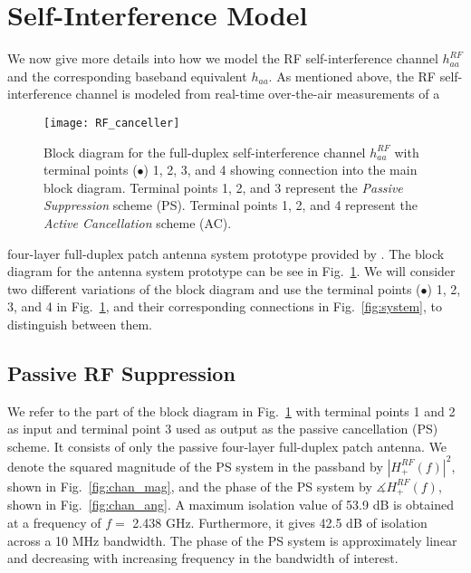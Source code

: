 \documentclass[12pt, journal,draftcls,letterpaper,onecolumn]{IEEEtran}
\begin{document}
\section{Self-Interference Model}
\label{sec:self_int_model}
We now give more details into how we model the RF self-interference channel $h^{RF}_{aa}$ and the corresponding baseband equivalent $h_{aa}$.  As mentioned above, the RF self-interference channel is modeled from real-time over-the-air measurements of a 
\begin{figure}[htp]
\begin{center} 
  \texttt{[image: RF\_canceller]}
\caption[fig:system]{Block diagram for the full-duplex self-interference channel $h_{aa}^{RF}$ with terminal points ($\bullet$) 1, 2, 3, and 4 showing connection into the main block diagram.  Terminal points 1, 2, and 3 represent the \emph{Passive Suppression} scheme (PS).  Terminal points 1, 2, and 4 represent the \emph{Active Cancellation} scheme (AC).}
  \label{fig:RF_canceller}
\end{center} 
\end{figure} 
four-layer full-duplex patch antenna system prototype provided by \cite{RISC_WEB}. 
The block diagram for the antenna system prototype can be see in Fig.~\ref{fig:RF_canceller}.  We will consider two different variations of the block diagram and use the terminal points ($\bullet$) 1, 2, 3, and 4 in Fig.~\ref{fig:RF_canceller}, and their corresponding connections in Fig.~\ref{fig:system}, to distinguish between them.  
 
\subsection{Passive RF Suppression}
We refer to the part of the block diagram in Fig.~\ref{fig:RF_canceller} with terminal points 1 and 2 as input and terminal point 3 used as output as the passive cancellation (PS) scheme.  It consists of only the passive four-layer full-duplex patch antenna.  We denote the squared magnitude of the PS system in the passband by $|H^{RF}_{+}(f)|^2$, shown in Fig.~\ref{fig:chan_mag}, and the phase of the PS system by $\measuredangle H^{RF}_{+}(f)$, shown in Fig.~\ref{fig:chan_ang}. A maximum isolation value of 53.9 dB is obtained at a frequency of $f = $ 2.438 GHz.  Furthermore, it gives 42.5 dB of isolation across a 10 MHz bandwidth.  The phase of the PS system is approximately linear and decreasing with increasing frequency in the bandwidth of interest. 
\end{document}
